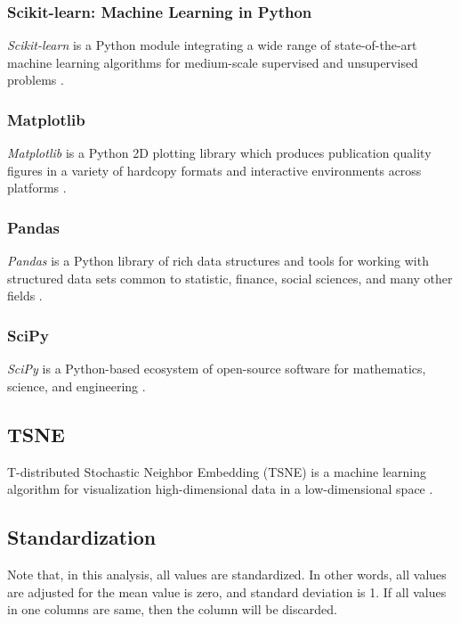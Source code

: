 \documentclass[aps, 10pt, a4paper]{article}
\begin{document}
            \subsubsection{Scikit-learn: Machine Learning in Python}
                \textit{Scikit-learn} is a Python module integrating a wide range of state-of-the-art machine learning algorithms for medium-scale supervised and unsupervised problems \cite{ref:sklearn1}.
                
            \subsubsection{Matplotlib}
                \textit{Matplotlib} is a Python 2D plotting library which produces publication quality figures in a variety of hardcopy formats and interactive environments across platforms \cite{ref:matplotlib1}.
                
            \subsubsection{Pandas}
                \textit{Pandas} is a Python library of rich data structures and tools for working with structured data sets common to statistic, finance, social sciences, and many other fields \cite{ref:pandas1}.
                
            \subsubsection{SciPy}
                \textit{SciPy} is a Python-based ecosystem of open-source software for mathematics, science, and engineering \cite{ref:scipy1}.
                
        \subsection{TSNE}
            T-distributed Stochastic Neighbor Embedding (TSNE) is a machine learning algorithm for visualization high-dimensional data in a low-dimensional space \cite{ref:tsne1}.
         
        \subsection{Standardization}
            Note that, in this analysis, all values are standardized. In other words, all values are adjusted for the mean value is zero, and standard deviation is 1. If all values in one columns are same, then the column will be discarded. 
    
\end{document}
